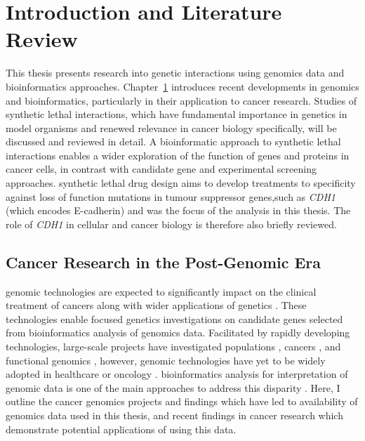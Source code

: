 \chapter{Introduction and Literature Review}
\label{chap:intro}



This thesis presents research into genetic interactions using \glspl{genomic} data and \gls{bioinformatics} approaches. Chapter~\ref{chap:intro} introduces recent developments in \glspl{genomic} and \gls{bioinformatics}, particularly in their application to \gls{cancer} research. Studies of \gls{synthetic lethal} interactions, which have fundamental importance in genetics in model organisms and renewed relevance in \gls{cancer} biology specifically, will be discussed and reviewed in detail.
A bioinformatic approach to \gls{synthetic lethal} interactions enables a wider exploration of the function of genes and proteins in \gls{cancer} cells, in contrast with candidate gene and experimental screening approaches. \Gls{synthetic lethal} drug design aims to develop \glspl{treatment} to specificity against loss of function \glspl{mutation} in \gls{tumour suppressor} genes,such as \textit{CDH1} (which encodes \gls{E-cadherin}) and was the focus of the analysis in this thesis. The role of \textit{CDH1} in cellular and \gls{cancer} biology is therefore also briefly reviewed. 



\section{Cancer Research in the Post-Genomic Era}

\Gls{genomic} technologies are expected to significantly impact on the clinical treatment of \glspl{cancer} along with wider applications of genetics \citep{Goodwin2016, Roychowdhury2016}. These technologies enable focused genetics investigations on candidate genes selected from \gls{bioinformatics} analysis of \glspl{genomic} data. Facilitated by rapidly developing technologies, large-scale projects have investigated populations \citep{1000Genomes2010}, \glspl{cancer} \citep{Dickson1999, ICGC2011}, and functional \glspl{genomic} \citep{ENCODE2004, FANTOM2001}, however, \gls{genomic} technologies have yet to be widely adopted in healthcare or oncology \citep{Roychowdhury2016, Waldron2016}. \gls{bioinformatics} analysis for interpretation of \gls{genomic} data is one of the main approaches to address this disparity \citep{Goodwin2016}. Here, I outline the \gls{cancer} \glspl{genomic} projects and findings which have led to availability of \glspl{genomic} data used in this thesis, and recent findings in \gls{cancer} research which demonstrate potential applications of using this data. 

